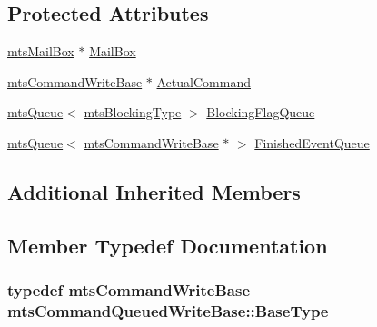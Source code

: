\subsection*{Protected Attributes}
\begin{DoxyCompactItemize}
\item 
\hyperlink{classmts_mail_box}{mts\-Mail\-Box} $\ast$ \hyperlink{classmts_command_queued_write_base_aff12f0b8e184ae4891388a5c0c647724}{Mail\-Box}
\item 
\hyperlink{classmts_command_write_base}{mts\-Command\-Write\-Base} $\ast$ \hyperlink{classmts_command_queued_write_base_a0b7c5cdfff1c742e84796cf3f80bbd68}{Actual\-Command}
\item 
\hyperlink{classmts_queue}{mts\-Queue}$<$ \hyperlink{mts_forward_declarations_8h_ad7426ccb6c883bc780d0ee197dddcbe7}{mts\-Blocking\-Type} $>$ \hyperlink{classmts_command_queued_write_base_a8aba2d8465fe58370e4058b9b4998621}{Blocking\-Flag\-Queue}
\item 
\hyperlink{classmts_queue}{mts\-Queue}$<$ \hyperlink{classmts_command_write_base}{mts\-Command\-Write\-Base} $\ast$ $>$ \hyperlink{classmts_command_queued_write_base_a67c11afa021916f995d1d537312c9a4c}{Finished\-Event\-Queue}
\end{DoxyCompactItemize}
\subsection*{Additional Inherited Members}


\subsection{Member Typedef Documentation}
\hypertarget{classmts_command_queued_write_base_aff4a3cf3c103da033abb3cbee439d1ce}{
\subsubsection[{Base\-Type}]{\setlength{\rightskip}{0pt plus 5cm}typedef {\bf mts\-Command\-Write\-Base} {\bf mts\-Command\-Queued\-Write\-Base\-::\-Base\-Type}\hspace{0.3cm}{\ttfamily [protected]}}}\label{classmts_command_queued_write_base_aff4a3cf3c103da033abb3cbee439d1ce}


